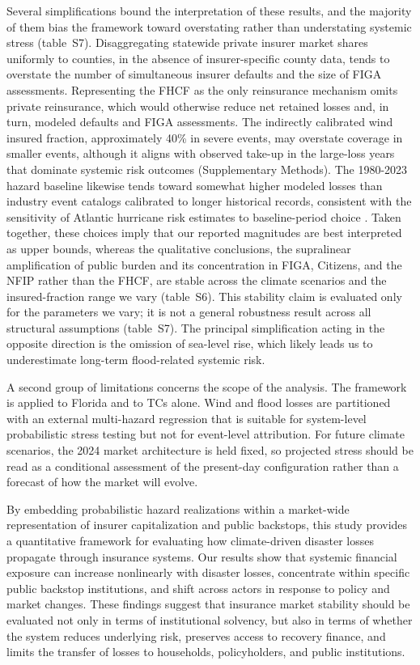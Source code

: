 \documentclass[fleqn,10pt]{wlscirep}
\newcommand{\SITabVI}{table~S6}
\newcommand{\SITabVIII}{table~S7}
\newcommand{\SIMethodsI}{Supplementary Methods}
\begin{document}
Several simplifications bound the interpretation of these results, and the majority of them bias the framework toward overstating rather than understating systemic stress (\SITabVIII). Disaggregating statewide private insurer market shares uniformly to counties, in the absence of insurer-specific county data, tends to overstate the number of simultaneous insurer defaults and the size of FIGA assessments.  Representing the FHCF as the only reinsurance mechanism omits private reinsurance, which would otherwise reduce net retained losses and, in turn, modeled defaults and FIGA assessments. The indirectly calibrated wind insured fraction, approximately 40\% in severe events, may overstate coverage in smaller events, although it aligns with observed take-up in the large-loss years that dominate systemic risk outcomes (\SIMethodsI). The 1980-2023 hazard baseline likewise tends toward somewhat higher modeled losses than industry event catalogs calibrated to longer historical records, consistent with the sensitivity of Atlantic hurricane risk estimates to baseline-period choice \cite{vecchi_changes_2021,emanuel_atlantic_2021,muller_normalized_2025}. Taken together, these choices imply that our reported magnitudes are best interpreted as upper bounds, whereas the qualitative conclusions, the supralinear amplification of public burden and its concentration in FIGA, Citizens, and the NFIP rather than the FHCF, are stable across the climate scenarios and the insured-fraction range we vary (\SITabVI). This stability claim is evaluated only for the parameters we vary; it is not a general robustness result across all structural assumptions (\SITabVIII). The principal simplification acting in the opposite direction is the omission of sea-level rise, which likely leads us to underestimate long-term flood-related systemic risk.

A second group of limitations concerns the scope of the analysis. The framework is applied to Florida and to TCs alone. Wind and flood losses are partitioned with an external multi-hazard regression that is suitable for system-level probabilistic stress testing but not for event-level attribution. For future climate scenarios, the 2024 market architecture is held fixed, so projected stress should be read as a conditional assessment of the present-day configuration rather than a forecast of how the market will evolve. \medskip

By embedding probabilistic hazard realizations within a market-wide representation of insurer capitalization and public backstops, this study provides a quantitative framework for evaluating how climate-driven disaster losses propagate through insurance systems. Our results show that systemic financial exposure can increase nonlinearly with disaster losses, concentrate within specific public backstop institutions, and shift across actors in response to policy and market changes. These findings suggest that insurance market stability should be evaluated not only in terms of institutional solvency, but also in terms of whether the system reduces underlying risk, preserves access to recovery finance, and limits the transfer of losses to households, policyholders, and public institutions.\medskip
\end{document}
